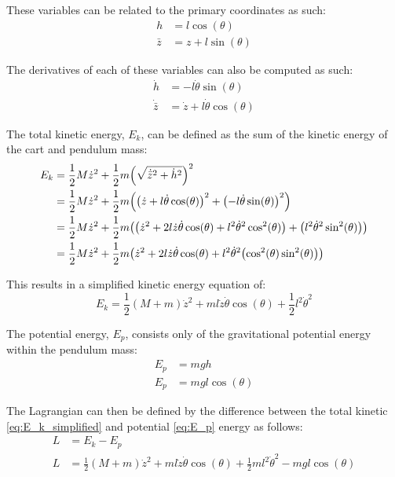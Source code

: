 \documentclass[]{article}
\begin{document}
		These variables can be related to the primary coordinates as such:
		\begin{align}
			h		&= l \cos(\theta) \label{eq:h_def}\\
			\bar{z} &= z + l \sin(\theta) \label{eq:z_def}	
		\end{align}
		
		The derivatives of each of these variables can also be computed as such:
		\begin{align}
			\dot{h} &= -l \dot{\theta} \sin(\theta) \label{eq:h_dot}\\
			\dot{\bar{z}} &= \dot{z} + l \dot{\theta}\cos(\theta) \label{eq:z}
		\end{align}
		
		The total kinetic energy, $E_k$, can be defined as the sum of the kinetic energy of the cart and pendulum mass:
		\begin{align}
			E_k &= \frac{1}{2} M \dot{z}^2 + \frac{1}{2} m \qty(\sqrt{\dot{\bar{z}}^2 + \dot{h}^2})^2 \label{eq:E_k_original}\\
				&= \frac{1}{2} M \dot{z}^2 + \frac{1}{2} m \qty(\qty(\dot{z} + l \dot{\theta}\cos(\theta))^2 + \qty(-l \dot{\theta} \sin(\theta))^2)\nonumber\\
				&= \frac{1}{2} M \dot{z}^2 + \frac{1}{2} m \qty(\qty(\dot{z}^2 + 2 l \dot{z} \dot{\theta}\cos(\theta) + l^2 \dot{\theta}^2 \cos[2](\theta)) + \qty(l^2 \dot{\theta}^2 \sin[2](\theta)))\nonumber\\
				&= \frac{1}{2} M \dot{z}^2 + \frac{1}{2} m \qty(\dot{z}^2 + 2 l \dot{z} \dot{\theta}\cos(\theta) + l^2 \dot{\theta}^2 \qty(\cos[2](\theta)\sin[2](\theta)))\nonumber
		\end{align}
		
		This results in a simplified kinetic energy equation of:
		\begin{equation}
				E_k = \frac{1}{2} (M + m) \dot{z}^2 + m l \dot{z} \dot{\theta}\cos(\theta) + \frac{1}{2} l^2 \dot{\theta}^2
				\label{eq:E_k_simplified}
		\end{equation}
		
		The potential energy, $E_p$, consists only of the gravitational potential energy within the pendulum mass:
		\begin{align}
			E_p &= m g h\\
			E_p &= m g l \cos(\theta) \label{eq:E_p}
		\end{align}
		
		The Lagrangian can then be defined by the difference between the total kinetic \eqref{eq:E_k_simplified} and potential \eqref{eq:E_p} energy as follows:
		\begin{align}
			L &= E_k - E_p\\
			L &= \frac{1}{2} (M + m) \dot{z}^2 + m l \dot{z} \dot{\theta}\cos(\theta) + \frac{1}{2} ml^2 \dot{\theta}^2 - m g l \cos(\theta) \label{eq:L}
		\end{align}
	
\end{document}
